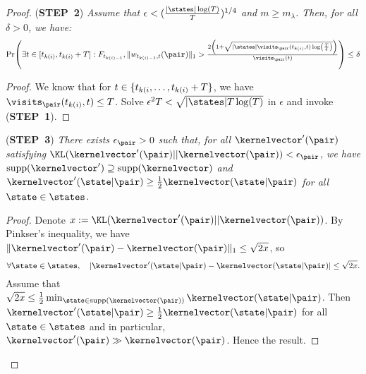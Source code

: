 \documentclass[preprint,cleveref,12pt]{colt2025}
\DeclarePairedDelimiter{\braces}{\{}{\}}	%
\DeclarePairedDelimiter{\parens}{(}{)}	%
\DeclarePairedDelimiter{\abs}{\lvert}{\rvert}	%
\DeclarePairedDelimiter{\norm}{\lVert}{\rVert}	%
\def\kernel{\kernelvector}
\def\STEP#1{(\strong{STEP~#1})}
\newcommand{\strong}[1]{\textbf{#1}}
\begin{document}
\begin{proof}
        \noindent
        \STEP{2}
        \textit{
            Assume that $\epsilon < (\frac{\abs{\states}\log(T)}T)^{1/4}$ and $m \ge m_\lambda$.
            Then, for all $\delta > 0$, we have:
            \begin{equation*}
                \Pr \parens*{
                    \exists t \in [t_{k(i)}, t_{k(i)}+T]
                    :
                    F_{t_{k(i)-1}}, 
                    \norm{w_{t_{k(i)-1}, t}(\pair)}_1
                    >
                    \tfrac { %
                        2 \parens*{
                            1 
                            + 
                            \sqrt{\abs{\states} \visits_\pair(t_{k(i)},t) \log\parens*{\frac T\delta}}
                        }
                    }{
                        \visits_\pair(t)
                    }
                }
                \le
                \delta
            \end{equation*}
        }
        \begin{proof}
            We know that for $t \in \braces{t_{k(i}, \ldots, t_{k(i)}+T}$, we have $\visits_\pair(t_{k(i)}, t) \le T$. 
            Solve $\epsilon^2 T < \sqrt{\abs{\states} T \log(T)}$ in $\epsilon$ and invoke \STEP{1}.
        \end{proof}

        \noindent
        \STEP{3}
        \textit{
            There exists $\epsilon_\pair > 0$ such that, for all $\kernel'(\pair)$ satisfying $\KL(\kernel'(\pair)||\kernel(\pair)) < \epsilon_\pair$, we have $\mathrm{supp}(\kernel') \supseteq \mathrm{supp}(\kernel)$ and $\kernel'(\state|\pair) \ge \frac 12 \kernel(\state|\pair)$ for all $\state \in \states$. 
        }
        \medskip
        \begin{proof}
            Denote $x := \KL(\kernel'(\pair)||\kernel(\pair))$.
            By Pinkser's inequality, we have $\norm{\kernel'(\pair) - \kernel(\pair)}_1 \le \sqrt{2x}$, so
            \begin{equation*}
                \forall \state \in \states,
                \quad
                \abs{\kernel'(\state|\pair) - \kernel(\state|\pair)} \le \sqrt{2x}
                .
            \end{equation*}
            Assume that $\sqrt{2x} \le \frac 12 \min_{\state \in \mathrm{supp}(\kernel(\pair))} \kernel(\state|\pair)$. 
            Then $\kernel'(\state|\pair) \ge \frac 12 \kernel(\state|\pair)$ for all $\state \in \states$ and in particular, $\kernel'(\pair) \gg \kernel(\pair)$. 
            Hence the result. 
        \end{proof}


\end{proof}
\end{document}
